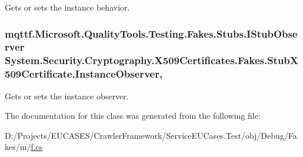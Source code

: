 Gets or sets the instance behavior.

\hypertarget{class_system_1_1_security_1_1_cryptography_1_1_x509_certificates_1_1_fakes_1_1_stub_x509_certificate_aa1905a254276511786175fef747486d3}{
\subsubsection[{Instance\-Observer}]{\setlength{\rightskip}{0pt plus 5cm}mqttf.\-Microsoft.\-Quality\-Tools.\-Testing.\-Fakes.\-Stubs.\-I\-Stub\-Observer System.\-Security.\-Cryptography.\-X509\-Certificates.\-Fakes.\-Stub\-X509\-Certificate.\-Instance\-Observer\hspace{0.3cm}{\ttfamily [get]}, {\ttfamily [set]}}}\label{class_system_1_1_security_1_1_cryptography_1_1_x509_certificates_1_1_fakes_1_1_stub_x509_certificate_aa1905a254276511786175fef747486d3}


Gets or sets the instance observer.



The documentation for this class was generated from the following file\-:\begin{DoxyCompactItemize}
\item 
D\-:/\-Projects/\-E\-U\-C\-A\-S\-E\-S/\-Crawler\-Framework/\-Service\-E\-U\-Cases.\-Test/obj/\-Debug/\-Fakes/m/\hyperlink{m_2f_8cs}{f.\-cs}\end{DoxyCompactItemize}
